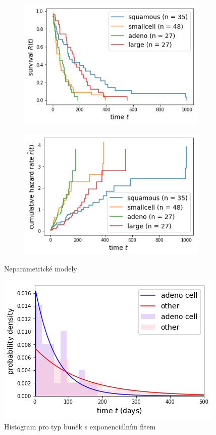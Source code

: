 \documentclass[10pt]{article}
\begin{document}
  \begin{figure}[htb!]
\centering
    \begin{subfigure}{.4\linewidth}
    \centering
    \includegraphics[width=.99\textwidth]{Images/kmcell.png}
  \end{subfigure}%
    \begin{subfigure}{.4\linewidth}
    \centering
    \includegraphics[width=.99\textwidth]{Images/nacell.png}
  \end{subfigure}%
  \caption{Neparametrické modely}\label{fig:cellkm} 
   \end{figure}
   
     \begin{figure}[htb!]
\centering
    \includegraphics[width=.6\textwidth]{Images/cell/histexp.png}
  \caption{Histogram pro typ buněk s exponenciálním fitem }\label{fig:cellexp} 
   \end{figure} 
   
\end{document}
